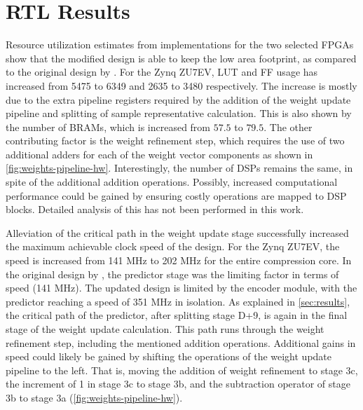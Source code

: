 \section{RTL Results}

Resource utilization estimates from implementations for the two selected \acrshort{FPGA}s show that the modified design is able to keep the low area footprint, as compared to the original design by \citeauthor{vorhaugHyperspectralImageCompression2024}. For the Zynq ZU7EV, \acrshort{LUT} and \acrshort{FF} usage has increased from 5475 to 6349 and 2635 to 3480 respectively. The increase is mostly due to the extra pipeline registers required by the addition of the weight update pipeline and splitting of sample representative calculation. This is also shown by the number of \acrshort{BRAM}s, which is increased from $57.5$ to $79.5$. The other contributing factor is the weight refinement step, which requires the use of two additional adders for each of the weight vector components as shown in \autoref{fig:weights-pipeline-hw}. Interestingly, the number of \acrshort{DSP}s remains the same, in spite of the additional addition operations. Possibly, increased computational performance could be gained by ensuring costly operations are mapped to \acrshort{DSP} blocks. Detailed analysis of this has not been performed in this work.

Alleviation of the critical path in the weight update stage successfully increased the maximum achievable clock speed of the design. For the Zynq ZU7EV, the speed is increased from 141 MHz to 202 MHz for the entire compression core. In the original design by \citeauthor{vorhaugHyperspectralImageCompression2024}, the predictor stage was the limiting factor in terms of speed (141 MHz). The updated design is limited by the encoder module, with the predictor reaching a speed of 351 MHz in isolation. As explained in \autoref{sec:results}, the critical path of the predictor, after splitting stage D+9, is again in the final stage of the weight update calculation. This path runs through the weight refinement step, including the mentioned addition operations. Additional gains in speed could likely be gained by shifting the operations of the weight update pipeline to the left. That is, moving the addition of weight refinement to stage 3c, the increment of 1 in stage 3c to stage 3b, and the subtraction operator of stage 3b to stage 3a (\autoref{fig:weights-pipeline-hw}).

